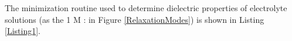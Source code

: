 The minimization routine used to determine dielectric properties of electrolyte solutions (as the 1 M : in Figure \ref{RelaxationModes}) is shown in Listing \ref{Listing1}.


\newpage








